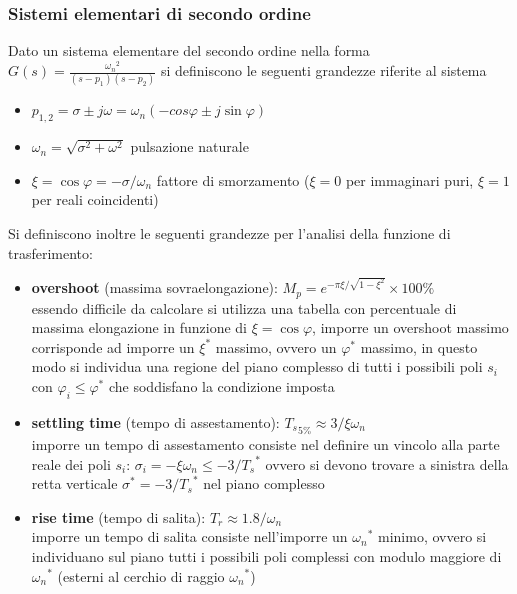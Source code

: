 \subsubsection*{Sistemi elementari di secondo ordine}
Dato un sistema elementare del secondo ordine nella forma \(\displaystyle G(s) = \frac{{\omega_n}^2}{(s-p_1)(s-p_2)}\) si definiscono
le seguenti grandezze riferite al sistema
\begin{itemize}
	\item \(p_{1,2} = \sigma \pm j\omega = \omega_n(-cos\varphi \pm j \sin\varphi)\)
	\item \(\omega_n = \sqrt{\sigma^2+\omega^2}\) pulsazione naturale
	\item \(\xi=\cos\varphi=-\sigma/\omega_n\) fattore di smorzamento (\(\xi=0\) per immaginari puri, \(\xi=1\) per reali coincidenti)
\end{itemize}
Si definiscono inoltre le seguenti grandezze per l'analisi della funzione di trasferimento:
\begin{itemize}
	\item \textbf{overshoot} (massima sovraelongazione): \(M_p = e^{-\pi\xi/\sqrt{1-\xi^2}} \times 100\%\)\\
	essendo difficile da calcolare si utilizza una tabella con percentuale di massima elongazione in funzione di \(\xi = \cos\varphi\),
	imporre un overshoot massimo corrisponde ad imporre un \(\xi^*\) massimo, ovvero un \(\varphi^*\) massimo, in questo modo si
	individua una regione del piano complesso di tutti i possibili poli \(s_i\) con \(\varphi_i \leq \varphi^*\) che soddisfano la
	condizione imposta
	\item \textbf{settling time} (tempo di assestamento): \({T_s}_\text{5\%} \approx 3/\xi\omega_n\) \\
	imporre un tempo di assestamento consiste nel definire un vincolo alla parte reale dei poli \(s_i\): \(\sigma_i = -\xi\omega_n \leq -3/{T_s}^*\)
	ovvero si devono trovare a sinistra della retta verticale \(\sigma^* = -3/{T_s}^*\) nel piano complesso
	\item \textbf{rise time} (tempo di salita): \(T_r \approx 1.8/\omega_n\) \\
	imporre un tempo di salita consiste nell'imporre un \({\omega_n}^*\) minimo, ovvero si individuano sul piano tutti i possibili poli
	complessi con modulo maggiore di \({\omega_n}^*\) (esterni al cerchio di raggio \({\omega_n}^*\))
\end{itemize}

